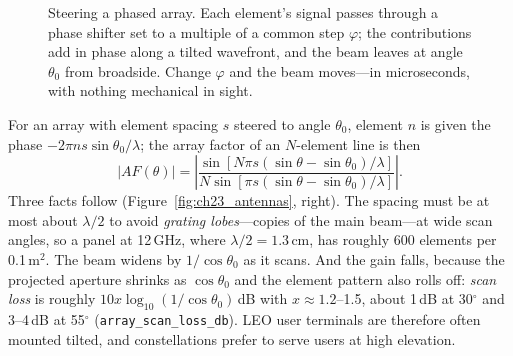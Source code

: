 \begin{figure}[htbp]\centering
{}
\caption{Steering a phased array. Each element's signal passes through a phase shifter set to a
multiple of a common step $\varphi$; the contributions add in phase along a tilted wavefront, and the
beam leaves at angle $\theta_0$ from broadside. Change $\varphi$ and the beam moves---in microseconds,
with nothing mechanical in sight.}
\label{fig:ch23_phased_tikz}
\end{figure}

For an array with element spacing $s$ steered to angle $\theta_0$, element $n$ is given
the phase $-2\pi ns\sin\theta_0/\lambda$; the array factor of an $N$-element line is then
\begin{equation}
|AF(\theta)|=\left|\frac{\sin[N\pi s(\sin\theta-\sin\theta_0)/\lambda]}{N\sin[\pi s(\sin\theta-\sin\theta_0)/\lambda]}\right| .
\end{equation}
Three facts follow (Figure~\ref{fig:ch23_antennas}, right). The spacing must be at most about
$\lambda/2$ to avoid \emph{grating lobes}---copies of the main beam---at wide scan angles, so a
panel at 12\,GHz, where $\lambda/2=1.3$\,cm, has roughly 600 elements per 0.1\,m$^2$. The beam
widens by $1/\cos\theta_0$ as it scans. And the gain falls, because the projected aperture
shrinks as $\cos\theta_0$ and the element pattern also rolls off: \emph{scan loss} is roughly
$10x\log_{10}(1/\cos\theta_0)$\,dB with $x\approx1.2$--1.5, about 1\,dB at 30$^\circ$ and 3--4\,dB at
55$^\circ$ (\texttt{array\_scan\_loss\_db}). LEO user terminals are therefore often mounted
tilted, and constellations prefer to serve users at high elevation.

